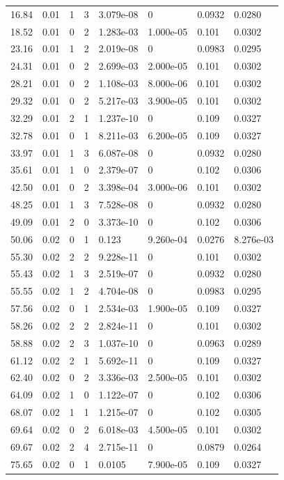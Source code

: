 \documentclass[preview]{standalone}
\begin{document}
{{\begin{tabular}{L{1.2cm}C{1.2cm} C{0.3cm}C{0.5cm} C{1.4cm}C{1.4cm} C{1.4cm}C{1.4cm}}
  16.84  &  0.01  & 1     &  3 &  3.079e-08  & 0  & 0.0932 &  0.0280   \\ 
  18.52  &  0.01  & 0     &  2 &  1.283e-03  & 1.000e-05  & 0.101 &  0.0302   \\ 
  23.16  &  0.01  & 1     &  2 &  2.019e-08  & 0  & 0.0983 &  0.0295   \\ 
  24.31  &  0.01  & 0     &  2 &  2.699e-03  & 2.000e-05  & 0.101 &  0.0302   \\ 
  28.21  &  0.01  & 0     &  2 &  1.108e-03  & 8.000e-06  & 0.101 &  0.0302   \\ 
  29.32  &  0.01  & 0     &  2 &  5.217e-03  & 3.900e-05  & 0.101 &  0.0302   \\ 
  32.29  &  0.01  & 2     &  1 &  1.237e-10  & 0  & 0.109 &  0.0327   \\ 
  32.78  &  0.01  & 0     &  1 &  8.211e-03  & 6.200e-05  & 0.109 &  0.0327   \\ 
  33.97  &  0.01  & 1     &  3 &  6.087e-08  & 0  & 0.0932 &  0.0280   \\ 
  35.61  &  0.01  & 1     &  0 &  2.379e-07  & 0  & 0.102 &  0.0306   \\ 
  42.50  &  0.01  & 0     &  2 &  3.398e-04  & 3.000e-06  & 0.101 &  0.0302   \\ 
  48.25  &  0.01  & 1     &  3 &  7.528e-08  & 0  & 0.0932 &  0.0280   \\ 
  49.09  &  0.01  & 2     &  0 &  3.373e-10  & 0  & 0.102 &  0.0306   \\ 
  50.06  &  0.02  & 0     &  1 &  0.123  & 9.260e-04  & 0.0276 &  8.276e-03   \\ 
  55.30  &  0.02  & 2     &  2 &  9.228e-11  & 0  & 0.101 &  0.0302   \\ 
  55.43  &  0.02  & 1     &  3 &  2.519e-07  & 0  & 0.0932 &  0.0280   \\ 
  55.55  &  0.02  & 1     &  2 &  4.704e-08  & 0  & 0.0983 &  0.0295   \\ 
  57.56  &  0.02  & 0     &  1 &  2.534e-03  & 1.900e-05  & 0.109 &  0.0327   \\ 
  58.26  &  0.02  & 2     &  2 &  2.824e-11  & 0  & 0.101 &  0.0302   \\ 
  58.88  &  0.02  & 2     &  3 &  1.037e-10  & 0  & 0.0963 &  0.0289   \\ 
  61.12  &  0.02  & 2     &  1 &  5.692e-11  & 0  & 0.109 &  0.0327   \\ 
  62.40  &  0.02  & 0     &  2 &  3.336e-03  & 2.500e-05  & 0.101 &  0.0302   \\ 
  64.09  &  0.02  & 1     &  0 &  1.122e-07  & 0  & 0.102 &  0.0306   \\ 
  68.07  &  0.02  & 1     &  1 &  1.215e-07  & 0  & 0.102 &  0.0305   \\ 
  69.64  &  0.02  & 0     &  2 &  6.018e-03  & 4.500e-05  & 0.101 &  0.0302   \\ 
  69.67  &  0.02  & 2     &  4 &  2.715e-11  & 0  & 0.0879 &  0.0264   \\ 
  75.65  &  0.02  & 0     &  1 &  0.0105  & 7.900e-05  & 0.109 &  0.0327   \\ 
\hline 
\end{tabular} 

}}
\end{document}
